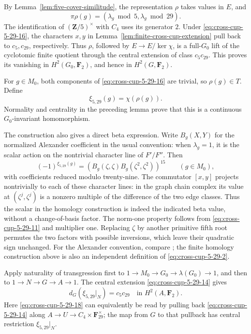 By Lemma~\ref{lem:five-cover-similitude}, the representation
\(\rho\) takes values in \(E\), and
\begin{equation}
                   \pi\rho(g)=(\lambda_g\bmod5,\lambda_g\bmod29).
                                                               \label{eq:cross-cup-5-29-16}
\end{equation}
The identification of \((\mathbf Z/5)^\times\) with
\(C_4\) uses its generator \(2\).
Under \eqref{eq:cross-cup-5-29-16}, the characters \(x,y\) in
Lemma~\ref{lem:finite-cross-cup-extension} pull back
to \(c_5,c_{29}\), respectively.
Thus \(\rho\), followed by \(E\to E/\ker\chi\), is a
full-\(G_0\) lift of the cyclotomic finite quotient
through the central extension of class \(c_5c_{29}\).
This proves its vanishing in \(H^2(G_0,\mathbf F_2)\),
and hence in \(H^2(G,\mathbf F_2)\).

For \(g\in M_0\), both components of \eqref{eq:cross-cup-5-29-16} are trivial,
so \(\rho(g)\in T\).
Define
\[
                          \xi_{5,29}(g)=\chi(\rho(g)).
\]
Normality and centrality in the preceding lemma prove
that this is a continuous \(G_0\)-invariant homomorphism.

The construction also gives a direct beta expression.
Write \(B_g(X,Y)\) for the normalized Alexander coefficient
in the usual convention: when \(\lambda_g=1\), it is the
scalar action on the nontrivial character line of
\(F'/F''\).
Then
\begin{equation}
 (-1)^{\xi_{5,29}(g)}
  =\left(
      B_g(\zeta,\zeta)
      B_g(\zeta^2,\zeta^2)
    \right)^{15}\qquad(g\in M_0),                          \label{eq:cross-cup-5-29-17}
\end{equation}
with coefficients reduced modulo twenty-nine.
The commutator \([x,y]\) projects nontrivially to each
of these character lines: in the graph chain complex
its value at \((\zeta^j,\zeta^j)\) is a nonzero multiple
of the difference of the two edge classes.
Thus the scalar in the homology construction is indeed
the indicated beta value, without a change-of-basis
factor.
The norm-one property follows from \eqref{eq:cross-cup-5-29-11} and multiplier
one.
Replacing \(\zeta\) by another primitive fifth root
permutes the two factors with possible inversions,
which leave their quadratic sign unchanged.
For the Alexander convention, compare
\cite[\S2.3, p.~101]{Furusho2003}; the finite homology
construction above is also an independent definition
of \eqref{eq:cross-cup-5-29-2}.

Apply naturality of transgression first to
\(1\to M_0\to G_0\to\lambda(G_0)\to1\), and then to
\(1\to N\to G\to A\to1\).
The central extension \eqref{eq:cross-cup-5-29-14} gives
\begin{equation}
                         d_G(\xi_{5,29}|_N)=c_5c_{29}
                              \quad\text{in }H^2(A,\mathbf F_2).
                                                               \label{eq:cross-cup-5-29-18}
\end{equation}
Here \eqref{eq:cross-cup-5-29-18} can equivalently be read by pulling back \eqref{eq:cross-cup-5-29-14}
along \(A\to U\to C_4\times\mathbf F_{29}^\times\);
the map from \(G\) to that pullback has central restriction
\(\xi_{5,29}|_N\).

